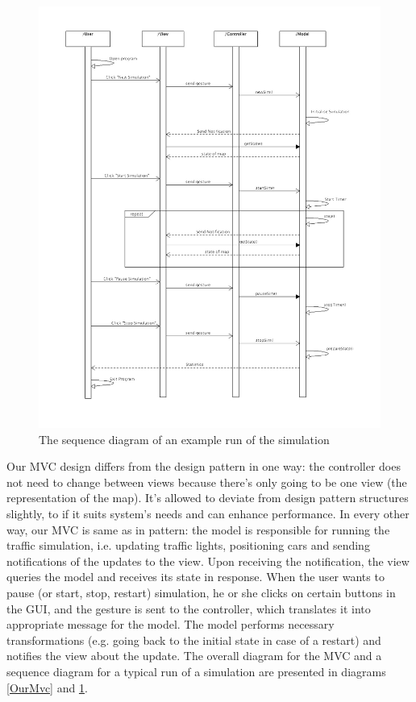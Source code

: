 \documentclass{article}
\begin{document}
   	\begin{figure}
   		\vspace{-35pt}
   		\centering
   		\includegraphics[width=1.15\textwidth]{SequenceDiagram}
   		\caption{The sequence diagram of an example run of the simulation}
   		\label{SequenceDiagram}
   	\end{figure}
   	

%

   Our MVC design differs from the design pattern in one way: the controller does not need to change between views because there’s only going to be one view (the representation of the map). It’s allowed to deviate from design pattern structures slightly, to if it suits system’s needs and can enhance performance. In every other way, our MVC is same as in pattern: the model is responsible for running the traffic simulation, i.e. updating traffic lights, positioning cars and sending notifications of the updates to the view. Upon receiving the notification, the view queries the model and receives its state in response. When the user wants to pause (or start, stop, restart) simulation, he or she clicks on certain buttons in the GUI, and the gesture is sent to the controller, which translates it into appropriate message for the model. The model performs necessary transformations (e.g. going back to the initial state in case of a restart) and notifies the view about the update. The overall diagram for the MVC and a sequence diagram for a typical run of a simulation are presented in diagrams \ref{OurMvc} and \ref{SequenceDiagram}. \\
   
\end{document}
